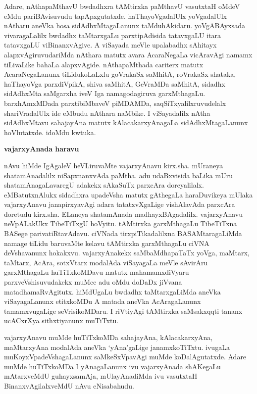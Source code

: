 Adare, nAthapaMthavU bwdadhxra tAMtirxka paMthavU vasutxtaH oMdeV eMdu pariBAvisuvudu tapApxgutatxde. haThayoVgadalUlx yoVgadalUlx nAtharu aneVka hosa sidAdhxMtagaLanunx taMduhAkidaru. yoVgABAyxsada vivaragaLalilx bwdadhx taMtarxgaLu parxtipAdisida tatavxgaLU itara tatavxgaLU viBinanxvAgive. A viSayada meVle upalabadhx sAhitayx alapxvAgiruvudariMda nAthara matutx avara AcaraNegaLa vicAravAgi namamx tiLivaLike bahaLa alapxvAgide. nAthapaMthada cariterx matutx AcaraNegaLanunx tiLidukoLaLxlu goVrakaSx saMhitA, roVrakaSx shataka, haThayoVga parxdiVpikA, shiva saMhitA, GeVraMDa saMhitA, sidadhx sidAdhxMta saMgarxha iveV Iga namagodagiruva garxMthagaLu. barxhAmxMDada parxtibiMbaveV piMDAMDa, saqSiTxyalilxruvudelalx shariVradalUlx ide eMbudu nAthara naMbike. I viSayadalilx nAtha sidAdhxMtavu sahajayAna matutx kAlacakarxyAnagaLa sidAdhxMtagaLanunx hoVlutatxde. idoMdu kwtuka.

\bigskip
\begin{center}
{\Large\bf vajarxyAnada haravu}
\end{center}

nAvu hiMde IgAgaleV heVLiruvaMte vajarxyAnavu kirx.sha. mUraneya shatamAnadalilx niSapxnanxvAda paMtha. adu udaBxvisida baLika mUru shatamAnagaLavaregU adakekx sAkaSuTx parxcAra doreyalilalx. eMBatutxnAlukx sidadhxra upadeVsha matutx gAthegaLa haraDuvikeya mUlaka vajarxyAnavu janapirxyavAgi adara tatatxvXgaLige vishAlavAda parxcAra doretudu kirx.sha. ELaneya shatamAnada madhayxBAgadalilx. vajarxyAnavu neVpALakUkx TibeTiTxgU hoVyitu. tAMtirxka garxMthagaLu TibeTiTxna BASege parivatiRtavAdavu. ciVNada tirxpiTikadalilxna BASAMtaragaLiMda namage tiLidu baruvaMte kelavu tAMtirxka garxMthagaLu ciVNA deVshavanunx hokakxvu. vajarxyAnakekx saMbaMdhapaTaTx yoVga, maMtarx, taMtarx, AcAra, sotxVtarx modalAda viSayagaLa meVle sAvirAru garxMthagaLu huTiTxkoMDavu matutx mahamamxdiVyaru parxveVshisuvudakekx muMce adu oMdu doDaDx jiVvana matadhamaRvAgitutx. hiMdUgaLu bwdadhx taMtarxgaLiMda aneVka viSayagaLanunx etitxkoMDu A matada aneVka AcAragaLanunx tamamxvugaLige seVrisikoMDaru. I riVtiyAgi tAMtirxka saMsakxqqti tananx ucACxrXya sithxtiyanunx muTiTxtu.

vajarxyAnavu muMde huTiTxkoMDa sahajayAna, kAlacakarxyAna, maMtarxyAna modalAda aneVka `yAna'gaLige janamxkoTiTxtu. ivugaLa muKoyxVpadeVshagaLanunx saMkeSxVpavAgi muMde koDalAgutatxde. Adare muMde huTiTxkoMDa I yAnagaLanunx ivu vajarxyAnada shAKegaLu mAtarxveMdU guhayxsamAja, mUlayAnadiMda ivu vasutxtaH BinanxvAgilalxveMdU nAvu eNisabahudu.

